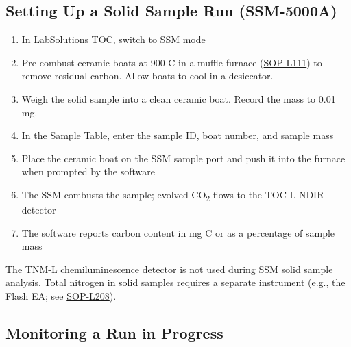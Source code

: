 \documentclass[
  11pt,
  letterpaper,
]{article}
\providecommand{\tightlist}{%
  \setlength{\itemsep}{0pt}\setlength{\parskip}{0pt}}
\begin{document}
\subsection{Setting Up a Solid Sample Run
(SSM-5000A)}\label{setting-up-a-solid-sample-run-ssm-5000a}

\begin{enumerate}
\def\labelenumi{\arabic{enumi}.}
\tightlist
\item
  In LabSolutions TOC, switch to SSM mode
\item
  Pre-combust ceramic boats at 900 C in a muffle furnace
  (\href{SOP-L111-muffle-furnace.qmd}{SOP-L111}) to remove residual
  carbon. Allow boats to cool in a desiccator.
\item
  Weigh the solid sample into a clean ceramic boat. Record the mass to
  0.01 mg.
\item
  In the Sample Table, enter the sample ID, boat number, and sample mass
\item
  Place the ceramic boat on the SSM sample port and push it into the
  furnace when prompted by the software
\item
  The SSM combusts the sample; evolved CO\textsubscript{2} flows to the
  TOC-L NDIR detector
\item
  The software reports carbon content in mg C or as a percentage of
  sample mass
\end{enumerate}

\begin{tcolorbox}[enhanced jigsaw, arc=.35mm, bottomrule=.15mm, bottomtitle=1mm, breakable, colback=white, colbacktitle=quarto-callout-note-color!10!white, colframe=quarto-callout-note-color-frame, coltitle=black, left=2mm, leftrule=.75mm, opacityback=0, opacitybacktitle=0.6, rightrule=.15mm, title=\textcolor{quarto-callout-note-color}{\faInfo}\hspace{0.5em}{TNM-L and SSM}, titlerule=0mm, toprule=.15mm, toptitle=1mm]

The TNM-L chemiluminescence detector is not used during SSM solid sample
analysis. Total nitrogen in solid samples requires a separate instrument
(e.g., the Flash EA; see
\href{SOP-L208-irms-general-instrument.qmd}{SOP-L208}).

\end{tcolorbox}

\subsection{Monitoring a Run in
Progress}\label{monitoring-a-run-in-progress}
\end{document}
